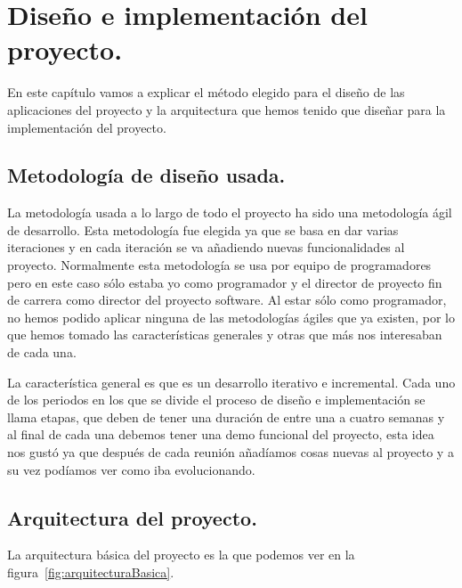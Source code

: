 \chapter{Diseño e implementación del proyecto.}

En este capítulo vamos a explicar el método elegido para el diseño de las aplicaciones del proyecto y la arquitectura que hemos tenido que diseñar para la implementación del proyecto.

\section{Metodología de diseño usada.}

La metodología usada a lo largo de todo el proyecto ha sido una metodología ágil de desarrollo. Esta metodología fue elegida ya que se basa en dar varias iteraciones y en cada iteración se va añadiendo nuevas funcionalidades al proyecto. Normalmente esta metodología se usa por equipo de programadores pero en este caso sólo estaba yo como programador y el director de proyecto fin de carrera como director del proyecto software. Al estar sólo como programador, no hemos podido aplicar ninguna de las metodologías ágiles que ya existen, por lo que hemos tomado las características generales y otras que más nos interesaban de cada una.

La característica general es que es un desarrollo iterativo e incremental. Cada uno de los periodos en los que se divide el proceso de diseño e implementación se llama etapas, que deben de tener una duración de entre una a cuatro semanas y al final de cada una debemos tener una demo funcional del proyecto, esta idea nos gustó ya que después de cada reunión añadíamos cosas nuevas al proyecto y a su vez podíamos ver como iba evolucionando.  

\section{Arquitectura del proyecto.}

La arquitectura básica del proyecto es la que podemos ver en la figura~\ref{fig:arquitecturaBasica}.

